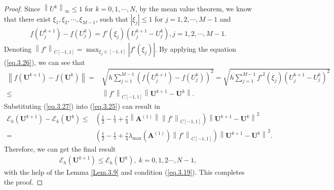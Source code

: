 \documentclass{siamart171218}
\numberwithin{theorem}{section}
\numberwithin{equation}{section}
\begin{document}
\begin{proof}
Since $\left\|U^k\right\|_\infty \leq1$  for $k= 0, 1, \cdots , N$, by the mean value theorem,
we know that
there exist
$\xi_1, \xi_2, \cdots , \xi_{M-1}$, such that $|\xi_j| \leq1$ for $j= 1, 2,\cdots , M-1$ and
 \begin{equation}\label{eq.3.26}
\begin{aligned}\displaystyle
f\left({U_j^{k+1}}\right)-
f\left({U_j^{k}}\right)=f'\left(\xi_j\right)\left(U_j^{k+1}-U_j^{k}\right),
j= 1, 2,\cdots , M-1.
\end{aligned}
\end{equation}
Denoting $\left\|f'\right\|_{C[-1,1]}=\max_{\xi_j\in[-1,1]}\left|f'\left(\xi_j\right)\right|$.
By applying the equation (\ref{eq.3.26}), we can see that
 \begin{equation}\label{eq.3.27}
\begin{aligned}\displaystyle
\left\|f\left(\mathbf{U}^{k+1}\right)- f\left(\mathbf{U}^{k}\right)\right\|=&
\sqrt{h\sum_{j=1}^{M-1}\left(f\left({U}^{k+1}_j\right)- f\left({U}^{k}_j\right)\right)^2}
=\sqrt{h\sum_{j=1}^{M-1}f'^2\left(\xi_j\right)\left(U_j^{k+1}-U_j^{k}\right)^2}\\
\leq&\left\|f'\right\|_{C[-1,1]}\left\|\mathbf{U}^{k+1}
-\mathbf{U}^k\right\|.
\end{aligned}
\end{equation}
Substituting (\ref{eq.3.27}) into (\ref{eq.3.25}) can result in
 \begin{equation*}
\begin{aligned}\displaystyle
{\mathcal{E}}_h\left(\mathbf{U}^{k+1}\right)-{\mathcal{E}}_h\left(\mathbf{U}^k\right)
 \leq&
\left(\frac{1}{2}-\frac{1}{\tau}+\frac{\tau}{4}\left\|\mathbf{A}^{(1)}\right\|\left\|f'\right\|_{C[-1,1]}
\right)\left\|\mathbf{U}^{k+1}-\mathbf{U}^k\right\|^2\\
=&\left(\frac{1}{2}-\frac{1}{\tau}+\frac{\tau}{4}\lambda_{\max}\left(\mathbf{A}^{(1)}\right)\left\|f'\right\|_{C[-1,1]}
\right)\left\|\mathbf{U}^{k+1}-\mathbf{U}^k\right\|^2.
\end{aligned}
\end{equation*}
Therefore, we can get the final result
\begin{equation*}
\begin{aligned}\displaystyle
{\mathcal{E}}_h\left(\mathbf{U}^{k+1}\right)
\leq{\mathcal{E}}_h\left(\mathbf{U}^k\right),\;k=0,1,2\cdots,N-1,
\end{aligned}
\end{equation*}
with the help of the Lemma \ref{Lem.3.9} and condition (\ref{eq.3.19}).
This completes the proof.
\end{proof}
\end{document}
